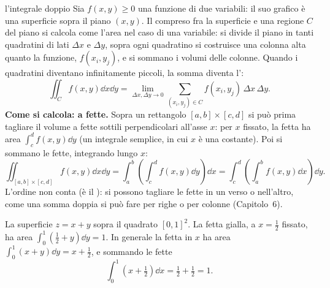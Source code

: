 \begin{richiamo}{l'integrale doppio}
Sia $f(x, y) \geq 0$ una funzione di due variabili: il suo grafico è una superficie sopra il piano $(x, y)$. Il
 compreso fra la superficie e una regione $C$ del piano si calcola come l'area nel caso di una variabile:
si divide il piano in tanti quadratini di lati $\Delta x$ e $\Delta y$, sopra ogni quadratino si costruisce una colonna
alta quanto la funzione, $f(x_i, y_j)$, e si sommano i volumi delle colonne. Quando i quadratini diventano
infinitamente piccoli, la somma diventa l':
\[ \iint_C f(x, y) \dd x \dd y = \lim_{\Delta x, \Delta y \to 0} \sum_{(x_i, y_j) \in C} f(x_i, y_j)\, \Delta x\, \Delta y . \]
\textbf{Come si calcola: a fette.} Sopra un rettangolo $[a, b] \times [c, d]$ si può prima tagliare il volume a fette
sottili perpendicolari all'asse $x$: per $x$ fissato, la fetta ha area $\int_c^d f(x, y) \dd y$ (un integrale semplice,
in cui $x$ è una costante). Poi si sommano le fette, integrando lungo $x$:
\[ \iint_{[a,b] \times [c,d]} f(x, y) \dd x \dd y = \int_a^b \left( \int_c^d f(x, y) \dd y \right) \dd x = \int_c^d
   \left( \int_a^b f(x, y) \dd x \right) \dd y . \]
L'ordine non conta (è il ): si possono tagliare le fette in un verso o nell'altro, come una somma
doppia si può fare per righe o per colonne (Capitolo~6).
\begin{center}
\hspace{0.3cm}
\begin{minipage}[b]{6.4cm}\small
La superficie $z = x + y$ sopra il quadrato $[0, 1]^2$. La fetta gialla, a $x = \frac12$ fissato, ha area
$\int_0^1 \left( \frac12 + y \right) \dd y = 1$. In generale la fetta in $x$ ha area $\int_0^1 (x + y) \dd y = x +
\frac12$, e sommando le fette
\[ \int_0^1 \left( x + \tfrac12 \right) \dd x = \tfrac12 + \tfrac12 = 1 . \]
\end{minipage}

\end{center}
\end{richiamo}
